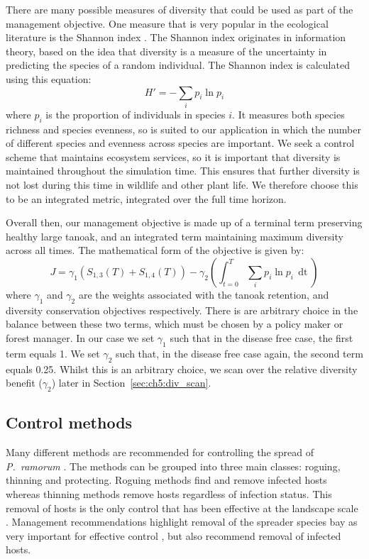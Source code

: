 There are many possible measures of diversity that could be used as part of the management objective. One measure that is very popular in the ecological literature is the Shannon index \citep[][pp.\ 106--108]{magurran_measuring_2013}. The Shannon index originates in information theory, based on the idea that diversity is a measure of the uncertainty in predicting the species of a random individual. The Shannon index is calculated using this equation:
\begin{equation}\label{eqn:ch5:shannon_idx}
    H' = -\sum_ip_i\ln{p_i}
\end{equation}
where $p_i$ is the proportion of individuals in species $i$. It measures both species richness and species evenness, so is suited to our application in which the number of different species and evenness across species are important. We seek a control scheme that maintains ecosystem services, so it is important that diversity is maintained throughout the simulation time. This ensures that further diversity is not lost during this time in wildlife and other plant life. We therefore choose this to be an integrated metric, integrated over the full time horizon.

Overall then, our management objective is made up of a terminal term preserving healthy large tanoak, and an integrated term maintaining maximum diversity across all times. The mathematical form of the objective is given by:
\begin{equation}\label{eqn:ch5:mgmt_obj}
    J = \gamma_1\left(S_{1,3}(T) + S_{1,4}(T)\right) - \gamma_2\left(\int_{t=0}^T \sum_ip_i\ln{p_i}\,\mathop{dt}\right)
\end{equation}
where $\gamma_1$ and $\gamma_2$ are the weights associated with the tanoak retention, and diversity conservation objectives respectively. There is are arbitrary choice in the balance between these two terms, which must be chosen by a policy maker or forest manager. In our case we set $\gamma_1$ such that in the disease free case, the first term equals 1. We set $\gamma_2$ such that, in the disease free case again, the second term equals 0.25. Whilst this is an arbitrary choice, we scan over the relative diversity benefit ($\gamma_2$) later in Section~\ref{sec:ch5:div_scan}.

\subsection{Control methods}

Many different methods are recommended for controlling the spread of \textit{P.~ramorum} \citep{swiecki_reference_2013}. The methods can be grouped into three main classes: roguing, thinning and protecting. Roguing methods find and remove infected hosts whereas thinning methods remove hosts regardless of infection status. This removal of hosts is the only control that has been effective at the landscape scale \citep{hansen_2008_epidemiology}. Management recommendations highlight removal of the spreader species bay as very important for effective control \citep{swiecki_reference_2013}, but also recommend removal of infected hosts.

